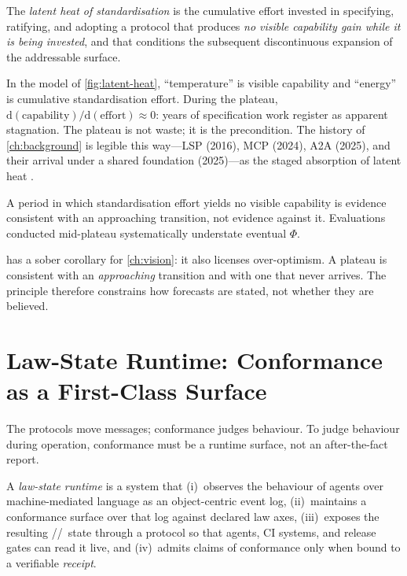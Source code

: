 \begin{definition}
\label{def:latent}
The \emph{latent heat of standardisation} is the cumulative effort invested in
specifying, ratifying, and adopting a protocol that produces \emph{no visible
capability gain while it is being invested}, and that conditions the subsequent
discontinuous expansion of the addressable surface.
\end{definition}

In the model of \cref{fig:latent-heat}, ``temperature'' is visible capability and
``energy'' is cumulative standardisation effort. During the plateau,
$\mathrm{d}(\text{capability})/\mathrm{d}(\text{effort}) \approx 0$: years of
specification work register as apparent stagnation. The plateau is not waste; it
is the precondition. The history of \cref{ch:background} is legible this way---LSP
(2016), MCP (2024), A2A (2025), and their arrival under a shared foundation
(2025)---as the staged absorption of latent heat \citep{lf-a2a-press,lf-aaif-press}.

\begin{principle}
\label{prin:plateau}
A period in which standardisation effort yields no visible capability is
evidence consistent with an approaching transition, not evidence against it.
Evaluations conducted mid-plateau systematically understate eventual $\Phi$.
\end{principle}

 has a sober corollary for \cref{ch:vision}: it also licenses
over-optimism. A plateau is consistent with an \emph{approaching} transition and
with one that never arrives. The principle therefore constrains how forecasts are
stated, not whether they are believed.

\section{Law-State Runtime: Conformance as a First-Class Surface}
\label{sec:fw-lawstate}

The protocols move messages; conformance judges behaviour. To judge behaviour
during operation, conformance must be a runtime surface, not an after-the-fact
report.

\begin{definition}
\label{def:lawstate}
A \emph{law-state runtime} is a system that (i)~observes the behaviour of agents
over machine-mediated language as an object-centric event log, (ii)~maintains a
conformance surface over that log against declared law axes, (iii)~exposes the
resulting \admitted//\unknownstat\ state through a protocol so that
agents, CI systems, and release gates can read it live, and (iv)~admits claims
of conformance only when bound to a verifiable \emph{receipt}.
\end{definition}

